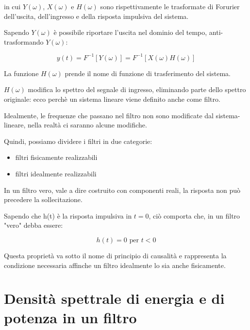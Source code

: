 in cui $Y(\omega)$,  $X(\omega)$ e $H(\omega)$ sono rispettivamente le trasformate di Forurier 
dell'uscita, dell'ingresso e della risposta impulsiva del sistema. \newline 

Sapendo $Y(\omega)$ è possibile riportare l'uscita nel dominio del tempo, anti-trasformando $Y(\omega)$: 

{
    \Large 
    \begin{equation}
        y (t)= F^{-1} [Y(\omega)] = F^{-1} [X(\omega) H(\omega) ] 
    \end{equation}
}

La funzione $H(\omega)$ prende il nome di funzione di trasferimento del sistema. \newline 

$H(\omega)$ modifica lo spettro del segnale di ingresso, eliminando parte dello spettro originale: 
ecco perchè un sistema lineare viene definito anche come filtro. \newline 

Idealmente, le frequenze che passano nel filtro non sono modificate dal sistema-lineare, 
nella realtà ci saranno alcune modifiche. \newline 


Quindi, possiamo dividere i filtri in due categorie: 

\begin{itemize}
    \item filtri fisicamente realizzabili 
    \item filtri idealmente realizzabili 
\end{itemize} 

In un filtro vero, vale a dire costruito con componenti reali, la risposta non può precedere la sollecitazione. \newline 

Sapendo che h(t) è la risposta impulsiva in $t=0$, ciò comporta che, in un filtro "vero" debba essere: 

{
    \Large 
    \begin{equation}
        h(t) = 0 \text{ per } t < 0 
    \end{equation}
} 

Questa proprietà va sotto il nome di principio di causalità e rappresenta la condizione necessaria affinche
un filtro idealmente lo sia anche fisicamente. \newline 

\newpage 


\section{Densità spettrale di energia e di potenza in un filtro} 


